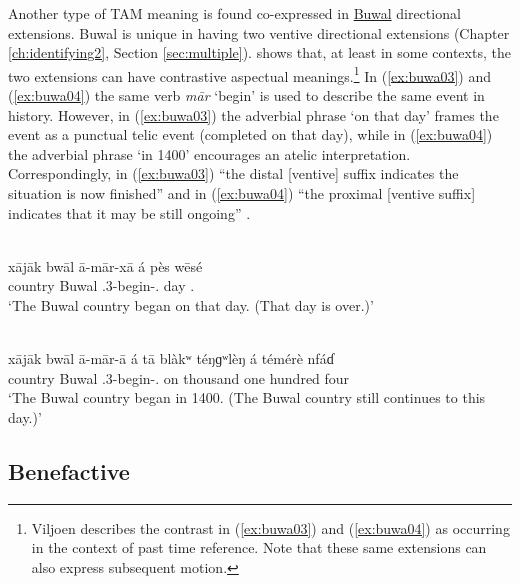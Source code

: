 Another type of TAM meaning is found co-expressed in \hyperref[buwa]{Buwal} directional extensions. Buwal is unique in having two ventive directional extensions (Chapter \ref{ch:identifying2}, Section \ref{sec:multiple}). \citet[375--376]{viljoenGrammaticalDescriptionBuwal2013} shows that, at least in some contexts, the two extensions can have contrastive aspectual meanings.\footnote{Viljoen describes the contrast in (\ref{ex:buwa03}) and (\ref{ex:buwa04}) as occurring in the context of past time reference. Note that these same extensions can also express subsequent motion.} In (\ref{ex:buwa03}) and (\ref{ex:buwa04}) the same verb \textit{mār} `begin' is used to describe the same event in history. However, in (\ref{ex:buwa03}) the adverbial phrase `on that day' frames the event as a punctual telic event (completed on that day), while in (\ref{ex:buwa04}) the adverbial phrase `in 1400' encourages an atelic interpretation. Correspondingly, in (\ref{ex:buwa03}) ``the distal [ventive] suffix indicates the situation is now finished'' and in (\ref{ex:buwa04}) ``the proximal [ventive suffix] indicates that it may be still ongoing'' \citep[376]{viljoenGrammaticalDescriptionBuwal2013}.

\ea\label{ex:buwa03}
 \\
\gll xājāk bwāl ā-mār-xā á pès wēsé	\\
country Buwal .3-begin-.  day .		\\
\glt `The Buwal country began on that day. (That day is over.)'

\ex\label{ex:buwa04}
 \\
\gll xājāk bwāl ā-mār-ā á tā blàkʷ téŋɡʷlèŋ á témérè nfáɗ	\\
country Buwal .3-begin-.  on thousand one  hundred four		\\
\glt `The Buwal country began in 1400. (The Buwal country still continues to this day.)'
\z 

\subsection{Benefactive} \label{sec:beneficiary}

